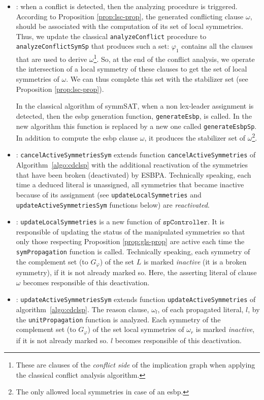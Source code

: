\begin{itemize}[topsep=2pt]
 \item {}: when a conflict is detected, then the analyzing
 procedure is triggered. According to Proposition \ref{prop:lsc-prop}, the
 generated conflicting clause $\omega$, should be associated with the
 computation of its set of local symmetries. Thus, we update the classical
 \texttt{analyzeConflict} procedure to \texttt{analyzeConflictSymSp} that produces such
 a set: $\varphi_1$ contains all the clauses that are used to derive $\omega$\footnote{These are clauses of the \textit{conflict side} of the implication graph when applying the classical conflict analysis algorithm.}. So, at the end of the conflict analysis, we operate the intersection of a local symmetry of these clauses to get the set of local symmetries of $\omega$. We can thus complete this set with the stabilizer set (see Proposition \ref{prop:lsc-prop}).
 
 In the classical algorithm of symmSAT, when a non lex-leader assignment is detected, then the esbp generation function, \texttt{generateEsbp}, is
 called. In the new algorithm this function is replaced by a new one called
 \texttt{generateEsbpSp}. In addition to compute the esbp clause $\omega$, it
 produces the stabilizer set of $\omega$\footnote{The only allowed  local symmetries in case of an esbp.}.
 
 \item {}: \texttt{cancelActiveSymmetriesSym} extends function \texttt{cancelActiveSymmetries} of Algorithm~\ref{algo:cdclsp} with the additional reactivation of the symmetries that have been broken (deactivated) by ESBPA. Technically speaking, each time a deduced literal is unassigned, all symmetries that became inactive because of its assignment (see \texttt{updateLocalSymmetries} and \texttt{updateActiveSymmetriesSym} functions below) are \textit{reactivated}.
 
 \item {}: \texttt{updateLocalSymmetries} is a new function of
 $\texttt{spController}$. It is responsible of updating the status of the manipulated
 symmetries so that only those respecting Proposition \ref{prop:gls-prop} are
 active each time the \texttt{symPropagation} function is called. Technically speaking, each symmetry of the complement set (to $G_{\varphi}$) of the set $L$ is marked \textit{inactive} (it is a broken symmetry), if it is not already marked so. Here, the asserting literal of clause $\omega$ becomes responsible of this deactivation. 
 
 \item {}: \texttt{updateActiveSymmetriesSym} extends function \texttt{updateActiveSymmetries} of algorithm~\ref{algo:cdclsp}. The reason clause, $\omega_l$, of each propagated literal, $l$, by the \texttt{unitPropagation} function is analyzed. Each symmetry of the complement set (to $G_{\varphi}$) of the set local symmetries of $\omega_r$ is marked \textit{inactive}, if it is not already marked so. $l$ becomes responsible of this deactivation. 
\end{itemize}

